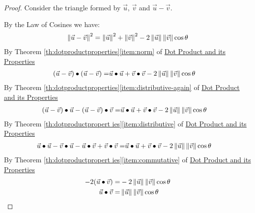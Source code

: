 \documentclass{ximera}
\begin{document}
 
\begin{proof} Consider the triangle formed by $\vec{u}$, $\vec{v}$ and $\vec{u}-\vec{v}$.
 
\begin{center}
\end{center}
 
By the Law of Cosines we have:
\begin{align*}
\left\|\vec{u}-\vec{v}\right\|^2=\left\|\vec{u}\right\|^2+\left\|\vec{v}\right\|^2-2\left\|\vec{u}\right\|\left\|\vec{v}\right\|\cos\theta
\end{align*}
By Theorem \ref{th:dotproductproperties}\ref{item:norm} of \href{https://ximera.osu.edu/oerlinalg/LinearAlgebra/VEC-0050/main}{Dot Product and its Properties}
\begin{align*}
(\vec{u}-\vec{v})\bullet (\vec{u}-\vec{v})=&\vec{u}\bullet \vec{u}+\vec{v}\bullet \vec{v}-2\left\|\vec{u}\right\|\left\|\vec{v}\right\|\cos\theta
\end{align*}
By Theorem \ref{th:dotproductproperties}\ref{item:distributive-again} of \href{https://ximera.osu.edu/oerlinalg/LinearAlgebra/VEC-0050/main}{Dot Product and its Properties}
\begin{align*}
(\vec{u}-\vec{v})\bullet \vec{u}-(\vec{u}-\vec{v})\bullet \vec{v}=&\vec{u}\bullet \vec{u}+\vec{v}\bullet \vec{v}-2\left\|\vec{u}\right\|\left\|\vec{v}\right\|\cos\theta
\end{align*}
By Theorem \ref{th:dotproductpropert ies}\ref{item:distributive} of \href{https://ximera.osu.edu/oerlinalg/LinearAlgebra/VEC-0050/main}{Dot Product and its Properties}
\begin{align*}
\vec{u}\bullet \vec{u}-\vec{v}\bullet\vec{u}-\vec{u}\bullet\vec{v}+\vec{v}\bullet \vec{v}=&\vec{u}\bullet \vec{u}+\vec{v}\bullet \vec{v}-2\left\|\vec{u}\right\|\left\|\vec{v}\right\|\cos\theta
\end{align*}
By Theorem \ref{th:dotproductpropert ies}\ref{item:commutative} of \href{https://ximera.osu.edu/oerlinalg/LinearAlgebra/VEC-0050/main}{Dot Product and its Properties}
\begin{align*}
-2(\vec{u}\bullet \vec{v})=&-2\left\|\vec{u}\right\|\left\|\vec{v}\right\|\cos\theta\\
\vec{u}\bullet \vec{v}=&\left\|\vec{u}\right\|\left\|\vec{v}\right\|\cos\theta
\end{align*}
\end{proof}
 
\end{document}
